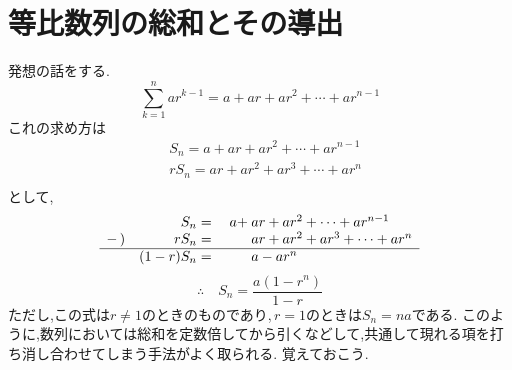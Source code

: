 
\section{等比数列の総和とその導出}
  発想の話をする.
  \[
    \sum_{k=1}^{n} ar^{k-1}=a+ar+ar^2+\cdots+ar^{n-1}
  \]
  これの求め方は
  \begin{align*}
    &S_{n}=a+ar+ar^2+\cdots+ar^{n-1} \tag*{\(\cdots\) (1)}\\
    &rS_n=ar+ar^2+ar^3+\cdots+ar^{n} \tag*{\(\cdots\) (2)}\\
  \end{align*}
  として,
  \[
  \begin{array}{rrrl}
      &S_{n}={}&a+&\hspace{-0.75em}ar+ar^2+\cdots+ar^{n-1}\\
    -\,) & rS_n={}&{}&\hspace{-0.75em}ar+ar^2+ar^3+\cdots+ar^{n}\\ \hline
      & (1-r)S_n={}&{}&\hspace{-0.75em}a-ar^n
  \end{array}
  \]
  \[
    \therefore \quad S_n=\frac{a(1-r^n)}{1-r}
  \]
  ただし,この式は$r\ne1$のときのものであり,\,$r=1$のときは$S_n=na$である.
  このように,数列においては総和を定数倍してから引くなどして,共通して現れる項を打ち消し合わせてしまう手法がよく取られる.
  覚えておこう.

